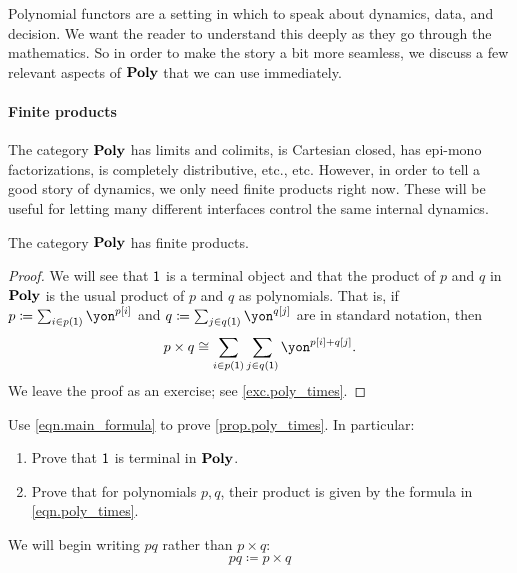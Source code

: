 \documentclass[Book-Poly]{subfiles}
\begin{document}
Polynomial functors are a setting in which to speak about dynamics, data, and decision. We want the reader to understand this deeply as they go through the mathematics. So in order to make the story a bit more seamless, we discuss a few relevant aspects of $\textbf{Poly}$ that we can use immediately.


\paragraph{Finite products}
The category $\textbf{Poly}$ has limits and colimits, is Cartesian closed, has epi-mono factorizations, is completely distributive, etc., etc. However, in order to tell a good story of dynamics, we only need finite products right now. These will be useful for letting many different interfaces control the same internal dynamics.

\begin{proposition}\label{prop.poly_times}
The category $\textbf{Poly}$ has finite products. 
\end{proposition}
\begin{proof}
We will see that $\textsf{1}$ is a terminal object and that the product of $p$ and $q$ in $\textbf{Poly}$ is the usual product of $p$ and $q$ as polynomials. That is, if $p\coloneqq\sum_{i\in p(\1)}\yon^{p[i]}$ and $q\coloneqq\sum_{j\in q(\1)}\yon^{q[j]}$ are in standard notation, then
\begin{equation}\label{eqn.poly_times}
p\times q\cong\sum_{i\in p(\1)}\sum_{j\in q(\1)}\yon^{p[i]+q[j]}.
\end{equation}
We leave the proof as an exercise; see \cref{exc.poly_times}.
\end{proof}

\begin{exercise}\label{exc.poly_times}
Use \cref{eqn.main_formula} to prove \cref{prop.poly_times}. In particular:
\begin{enumerate}
	\item Prove that $\textsf{1}$ is terminal in $\textbf{Poly}$.
	\item Prove that for polynomials $p,q$, their product is given by the formula in \eqref{eqn.poly_times}.
\qedhere
\end{enumerate}
\end{exercise}

We will begin writing $pq$ rather than $p\times q$:
\begin{equation} \tag{Notation}
pq\coloneqq p\times q
\end{equation}
\end{document}
